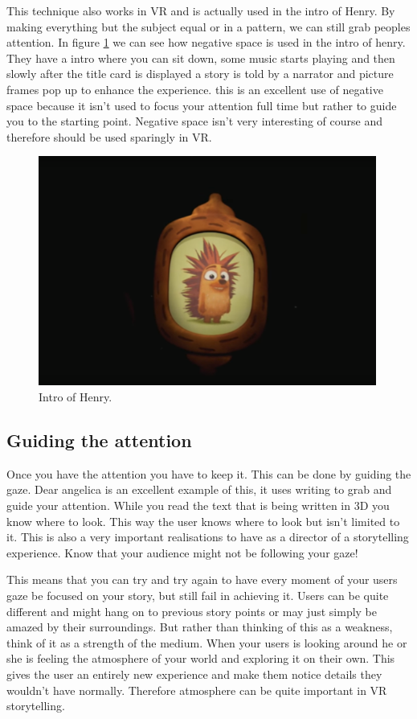 \documentclass{report}
\begin{document}
				This technique also works in VR and is actually used in the intro of Henry. By making everything but the subject equal or in a pattern, we can still grab peoples attention. 	
				In figure \ref{fig:henryIntro} we can see how negative space is used in the intro of henry. They have a intro where you can sit down, some music starts playing and then slowly after the title card is displayed a story is told by a narrator and picture frames pop up to enhance the experience. this is an excellent use of negative space because it isn't used to focus your attention full time but rather to guide you to the starting point. Negative space isn't very interesting of course and therefore should be used sparingly in VR. 
						
				\begin{figure}[h!]
					\centering
					 \includegraphics[width=30em]{img/henry_intro.png}
					\caption{Intro of Henry.}
					\label{fig:henryIntro}
				\end{figure}
				\subsection{Guiding the attention} 
				
				Once you have the attention you have to keep it. This can be done by guiding the gaze. Dear angelica is an excellent example of this, it uses writing to grab and guide your attention. While you read the text that is being written in 3D you know where to look. This way the user knows where to look but isn't limited to it. This is also a very important realisations to have as a director of a storytelling experience. Know that your audience might not be following your gaze!
				
				This means that you can try and try again to have every moment of your users gaze be focused on your story, but still fail in achieving it. Users can be quite different and might hang on to previous story points or may just simply be amazed by their surroundings. But rather than thinking of this as a weakness, think of it as a strength of the medium. When your users is looking around he or she is feeling the atmosphere of your world and exploring it on their own. This gives the user an entirely new experience and make them notice details they wouldn't have normally. Therefore atmosphere can be quite important in VR storytelling. 
				
\end{document}
